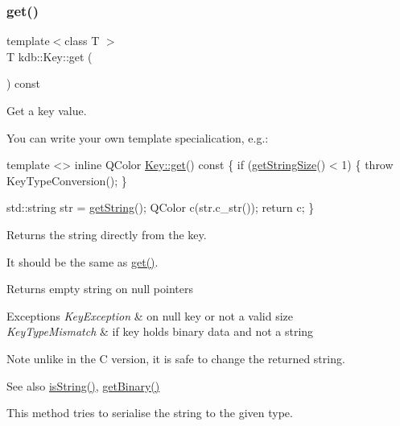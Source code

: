 \subsubsection{\texorpdfstring{get()}{get()}}
{\footnotesize\ttfamily template$<$class T $>$ \\
T kdb\+::\+Key\+::get (\begin{DoxyParamCaption}{ }\end{DoxyParamCaption}) const\hspace{0.3cm}{\ttfamily [inline]}}



Get a key value. 

You can write your own template specialication, e.\+g.\+: 
\begin{DoxyCode}
\textcolor{keyword}{template} <>
\textcolor{keyword}{inline} QColor \hyperlink{classkdb_1_1Key_ac558a1f1b2cb50d77fbabcbb24950c05}{Key::get}()\textcolor{keyword}{ const}
\textcolor{keyword}{}\{
        \textcolor{keywordflow}{if} (\hyperlink{classkdb_1_1Key_a4cfc9941a93a94b306b8264d0d21abc2}{getStringSize}() < 1)
        \{
                \textcolor{keywordflow}{throw} KeyTypeConversion();
        \}

        std::string str = \hyperlink{classkdb_1_1Key_af612ede3a73e57b317a65e40e7f9e01b}{getString}();
        QColor c(str.c\_str());
        \textcolor{keywordflow}{return} c;
\}
\end{DoxyCode}


\begin{DoxyReturn}{Returns}
the string directly from the key.
\end{DoxyReturn}
It should be the same as \hyperlink{classkdb_1_1Key_ac558a1f1b2cb50d77fbabcbb24950c05}{get()}. \begin{DoxyReturn}{Returns}
empty string on null pointers
\end{DoxyReturn}

\begin{DoxyExceptions}{Exceptions}
{\em Key\+Exception} & on null key or not a valid size \\
\hline
{\em Key\+Type\+Mismatch} & if key holds binary data and not a string\\
\hline
\end{DoxyExceptions}
\begin{DoxyNote}{Note}
unlike in the C version, it is safe to change the returned string.
\end{DoxyNote}
\begin{DoxySeeAlso}{See also}
\hyperlink{classkdb_1_1Key_a2170b1d9decef951b478454e3ee0b618}{is\+String()}, \hyperlink{classkdb_1_1Key_ada114aba31b321ddc984018b43a8568b}{get\+Binary()}
\end{DoxySeeAlso}
This method tries to serialise the string to the given type. \mbox{\label{classkdb_1_1Key_ab998c6e1b121b956653f01df5762aed8}} 
